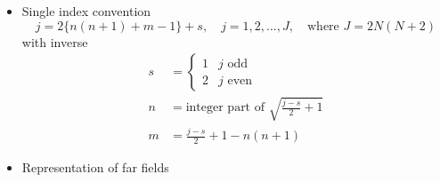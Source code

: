 \documentclass[a4paper,12pt]{article}
\newcommand{\mrm}[1]{\mathrm{#1}}
\renewcommand{\Re}{\operatorname{Re}}
\renewcommand{\Im}{\operatorname{Im}}
\newcommand{\iu}{\mrm{i}}
\begin{document}
\begin{itemize}
\begin{multline}
    = \frac{1}{4} \sum_{csmn}\sum_{\gamma\sigma\mu\nu} Q_{smn}^{(c)}Q_{\sigma\mu\nu}^{(\gamma)*} (-1)^{\mu} (-\delta_{s\sigma}\delta_{m,-(-\mu)}\delta_{n\nu}(-1)^{m}(-\iu)A^{(c,\gamma')}) \\
    = \frac{1}{4} \sum_{c\gamma smn} Q_{smn}^{(c)}Q_{smn}^{(\gamma)*} \iu A^{(c,\gamma')}
    = \sum_{smn}\frac{\iu}{4} [ Q_{smn}^{(1)}Q_{smn}^{(2)*} + Q_{smn}^{(1)}Q_{smn}^{(3)*}(-\iu) + Q_{smn}^{(1)}Q_{smn}^{(4)*}\iu \\
    + Q_{smn}^{(2)}Q_{smn}^{(1)*}(-1) + Q_{smn}^{(2)}Q_{smn}^{(3)*}(-1) + Q_{smn}^{(2)}Q_{smn}^{(4)*}(-1) \\
    + Q_{smn}^{(3)}Q_{smn}^{(1)*}(-\iu) + Q_{smn}^{(3)}Q_{smn}^{(2)*} + Q_{smn}^{(3)}Q_{smn}^{(3)*}(-2\iu) \\
    + Q_{smn}^{(4)}Q_{smn}^{(1)*}\iu + Q_{smn}^{(4)}Q_{smn}^{(2)*} + Q_{smn}^{(4)}Q_{smn}^{(4)*}(2\iu) ] \\
    = \frac{1}{2} \sum_{smn} \Big[ -\Im(Q_{smn}^{(1)}Q_{smn}^{(2)*}) + \Re(Q_{smn}^{(1)}Q_{smn}^{(3)*}) - \Re(Q_{smn}^{(1)}Q_{smn}^{(4)*}) \\
    + \Im(Q_{smn}^{(2)}Q_{smn}^{(3)*}) + \Im(Q_{smn}^{(2)}Q_{smn}^{(4)*}) + |Q_{smn}^{(3)}|^{2} - |Q_{smn}^{(4)}|^{2} \Big] \\
    = \frac{1}{2} \sum_{smn} \Big[ -\Im(Q_{smn}^{(1)}Q_{smn}^{(2)*}) + \Re(Q_{smn}^{(1)}(Q_{smn}^{(3)*} - Q_{smn}^{(4)*})) + \Im(Q_{smn}^{(2)}(Q_{smn}^{(3)*} + Q_{smn}^{(4)*})) \\
      + |Q_{smn}^{(3)}|^{2} - |Q_{smn}^{(4)}|^{2} \Big]
  \end{multline}
  which is
  $P = \frac{1}{2}\sum_{smn}|Q_{smn}^{(3)}|^{2} - |Q_{smn}^{(4)}|^{2}$
  if $Q_{smn}^{(1)} = Q_{smn}^{(2)} = 0$.
\item Single index convention
  \begin{equation}
    j = 2\{n(n+1) + m-1\} + s, \quad j = 1, 2, \ldots, J, \quad\text{where $J = 2N(N+2)$}
  \end{equation}
  with inverse
  \begin{align}
    s &= \begin{cases} 1 & \text{$j$ odd} \\ 2 & \text{$j$ even} \end{cases} \\
    n &= \text{integer part of $\displaystyle\sqrt{\frac{j-s}{2}+1}$} \\
    m &= \frac{j-s}{2} + 1 - n(n+1) 
  \end{align}
\item Representation of far fields

\end{itemize}
\end{document}
